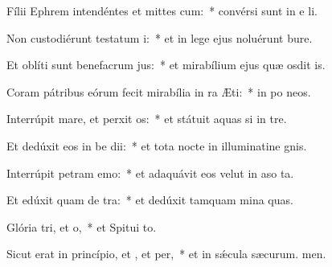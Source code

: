 \item Fílii Ephrem intendéntes et mittes cum:~* convérsi sunt in e li.
\item Non custodiérunt testatum i:~* et in lege ejus noluérunt bure.
\item Et oblíti sunt benefacrum jus:~* et mirabílium ejus quæ osdit is.
\item Coram pátribus eórum fecit mirabília in ra Æti:~* in po neos.
\item Interrúpit mare, et perxit os:~* et státuit aquas si in tre.
\item Et dedúxit eos in be dii:~* et tota nocte in illuminatine gnis.
\item Interrúpit petram  emo:~* et adaquávit eos velut in aso ta.
\item Et edúxit quam de tra:~* et dedúxit tamquam mina quas.
\item Glória tri, et o,~* et Spitui to.
\item Sicut erat in princípio, et , et per,~* et in sǽcula sæcurum. men.
